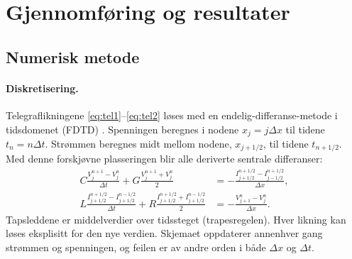 \documentclass[11pt,a4paper]{article}
\numberwithin{equation}{section}
\numberwithin{figure}{section}
\numberwithin{table}{section}
\begin{document}
\section{Gjennomføring og resultater}\label{sec:gjennomforing}

\subsection{Numerisk metode}\label{sec:numerikk}

\paragraph{Diskretisering.}
Telegraflikningene \eqref{eq:tel1}--\eqref{eq:tel2} løses med en
endelig-differanse-metode i tidsdomenet (FDTD) \cite{taflove2005,paul2008}.
Spenningen beregnes i nodene $x_j = j\Delta x$ til tidene $t_n = n\Delta t$.
Strømmen beregnes midt mellom nodene, $x_{j+1/2}$, til tidene $t_{n+1/2}$. Med
denne forskjøvne plasseringen blir alle deriverte sentrale differanser:
\begin{align}
  C\frac{V_j^{n+1} - V_j^n}{\Delta t} + G\frac{V_j^{n+1} + V_j^n}{2}
    &= -\frac{I_{j+1/2}^{n+1/2} - I_{j-1/2}^{n+1/2}}{\Delta x}, \label{eq:fd1}\\
  L\frac{I_{j+1/2}^{n+1/2} - I_{j+1/2}^{n-1/2}}{\Delta t} + R\frac{I_{j+1/2}^{n+1/2} + I_{j+1/2}^{n-1/2}}{2}
    &= -\frac{V_{j+1}^n - V_j^n}{\Delta x}. \label{eq:fd2}
\end{align}
Tapsleddene er middelverdier over tidssteget (trapesregelen). Hver likning
kan løses eksplisitt for den nye verdien. Skjemaet oppdaterer annenhver gang
strømmen og spenningen, og feilen er av andre orden i både $\Delta x$ og $\Delta t$.
\end{document}
